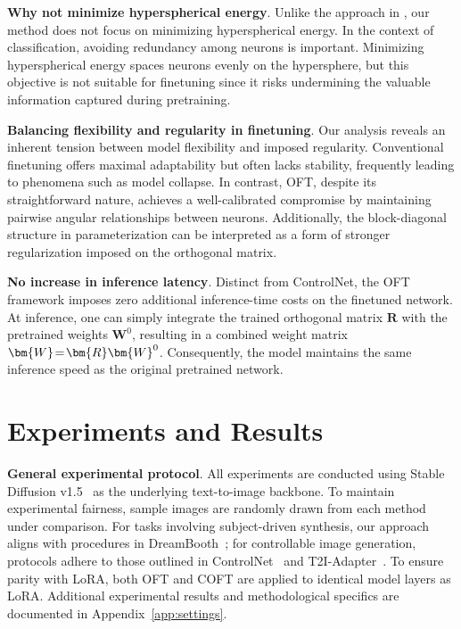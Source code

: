 \textbf{Why not minimize hyperspherical energy}. Unlike the approach in \cite{liu2021orthogonal}, our method does not focus on minimizing hyperspherical energy. In the context of classification, avoiding redundancy among neurons is important. Minimizing hyperspherical energy spaces neurons evenly on the hypersphere, but this objective is not suitable for finetuning since it risks undermining the valuable information captured during pretraining.

\textbf{Balancing flexibility and regularity in finetuning}. Our analysis reveals an inherent tension between model flexibility and imposed regularity. Conventional finetuning offers maximal adaptability but often lacks stability, frequently leading to phenomena such as model collapse. In contrast, OFT, despite its straightforward nature, achieves a well-calibrated compromise by maintaining pairwise angular relationships between neurons. Additionally, the block-diagonal structure in parameterization can be interpreted as a form of stronger regularization imposed on the orthogonal matrix.

\textbf{No increase in inference latency}. Distinct from ControlNet, the OFT framework imposes zero additional inference-time costs on the finetuned network. At inference, one can simply integrate the trained orthogonal matrix $\bm{R}$ with the pretrained weights $\bm{W}^0$, resulting in a combined weight matrix $\thickmuskip=2mu \medmuskip=2mu \bm{W}=\bm{R}\bm{W}^0$. Consequently, the model maintains the same inference speed as the original pretrained network.

\section{Experiments and Results}

\textbf{General experimental protocol}. All experiments are conducted using Stable Diffusion v1.5~\cite{rombach2022high} as the underlying text-to-image backbone. To maintain experimental fairness, sample images are randomly drawn from each method under comparison. For tasks involving subject-driven synthesis, our approach aligns with procedures in DreamBooth~\cite{ruiz2023dreambooth}; for controllable image generation, protocols adhere to those outlined in ControlNet~\cite{zhang2023adding} and T2I-Adapter~\cite{mou2023t2i}. To ensure parity with LoRA, both OFT and COFT are applied to identical model layers as LoRA. Additional experimental results and methodological specifics are documented in Appendix~\ref{app:settings}.

